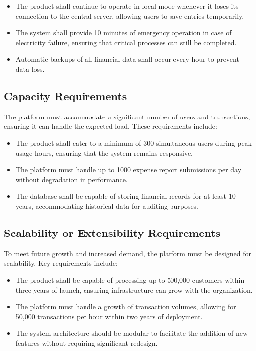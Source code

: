 \documentclass[12pt]{article}
\begin{document}
\begin{itemize}
    \item The product shall continue to operate in local mode whenever it loses its connection to the central server, allowing users to save entries temporarily.
    \item The system shall provide 10 minutes of emergency operation in case of electricity failure, ensuring that critical processes can still be completed.
    \item Automatic backups of all financial data shall occur every hour to prevent data loss.
\end{itemize}

\subsection{Capacity Requirements}
The platform must accommodate a significant number of users and transactions, ensuring it can handle the expected load. These requirements include:

\begin{itemize}
    \item The product shall cater to a minimum of 300 simultaneous users during peak usage hours, ensuring that the system remains responsive.
    \item The platform must handle up to 1000 expense report submissions per day without degradation in performance.
    \item The database shall be capable of storing financial records for at least 10 years, accommodating historical data for auditing purposes.
\end{itemize}

\subsection{Scalability or Extensibility Requirements}
To meet future growth and increased demand, the platform must be designed for scalability. Key requirements include:

\begin{itemize}
    \item The product shall be capable of processing up to 500,000 customers within three years of launch, ensuring infrastructure can grow with the organization.
    \item The platform must handle a growth of transaction volumes, allowing for 50,000 transactions per hour within two years of deployment.
    \item The system architecture should be modular to facilitate the addition of new features without requiring significant redesign.
\end{itemize}
\end{document}
